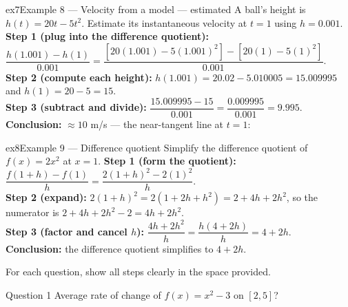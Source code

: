 \documentclass[11pt]{article}
\begin{document}
\begin{example}{ex7}{Example 8 --- Velocity from a model --- estimated}
A ball's height is $h(t)=20t-5t^2$. Estimate its instantaneous velocity at $t=1$ using $h=0.001$.\soln
\textbf{Step 1 (plug into the difference quotient):} $\dfrac{h(1.001)-h(1)}{0.001}=\dfrac{[20(1.001)-5(1.001)^2]-[20(1)-5(1)^2]}{0.001}$.\\[3pt]
\textbf{Step 2 (compute each height):} $h(1.001)=20.02-5.010005=15.009995$ and $h(1)=20-5=15$.\\[3pt]
\textbf{Step 3 (subtract and divide):} $\dfrac{15.009995-15}{0.001}=\dfrac{0.009995}{0.001}=9.995$.\\[3pt]
\textbf{Conclusion:} $\approx10$ m/s --- the near-tangent line at $t=1$:\begin{center}\end{center}
\end{example}

\begin{example}{ex8}{Example 9 --- Difference quotient}
Simplify the difference quotient of $f(x)=2x^2$ at $x=1$.\soln
\textbf{Step 1 (form the quotient):} $\dfrac{f(1+h)-f(1)}{h}=\dfrac{2(1+h)^2-2(1)^2}{h}$.\\[3pt]
\textbf{Step 2 (expand):} $2(1+h)^2=2(1+2h+h^2)=2+4h+2h^2$, so the numerator is $2+4h+2h^2-2=4h+2h^2$.\\[3pt]
\textbf{Step 3 (factor and cancel $h$):} $\dfrac{4h+2h^2}{h}=\dfrac{h(4+2h)}{h}=4+2h$.\\[3pt]
\textbf{Conclusion:} the difference quotient simplifies to $4+2h$.
\end{example}

\clearpage
{}
For each question, show all steps clearly in the space provided.

\begin{qbox}{Question 1}
Average rate of change of $f(x)=x^2-3$ on $[2,5]$?\workspace{2.4cm}
\end{qbox}
\end{document}
